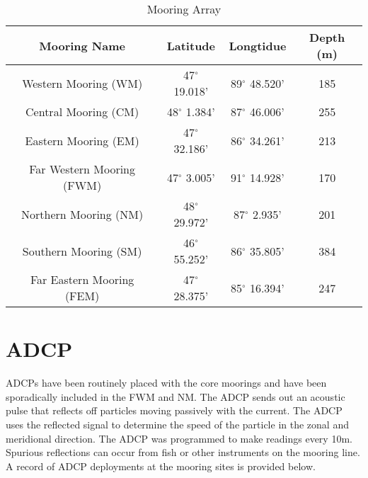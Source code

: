 

\begin{table}[H]
	\centering
		\caption{Mooring Array }
		\vspace{6pt} 
	\label{table:stratVals} %
	\begin{tabular}{c c c c}
	\hline \hline 									%
	\textbf{Mooring Name} & \textbf{Latitude} & \textbf{Longtidue} & \textbf{Depth (m)} \\ [0.5ex] %
	\hline 										
	Western Mooring (WM) & 47$^{\circ}$ 19.018' & 89$^{\circ}$ 48.520' & 185 \\ 
	Central Mooring (CM)   & 48$^{\circ}$ 1.384' & 87$^{\circ}$ 46.006' & 255 \\ 
	Eastern Mooring (EM)       & 47$^{\circ}$ 32.186' & 86$^{\circ}$ 34.261' & 213 \\ 
	\hline
	Far Western Mooring (FWM) & 47$^{\circ}$ 3.005' & 91$^{\circ}$ 14.928' & 170 \\ 
	Northern Mooring (NM) & 48$^{\circ}$ 29.972' & 87$^{\circ}$ 2.935' & 201 \\ 
	Southern Mooring (SM) & 46$^{\circ}$ 55.252' & 86$^{\circ}$ 35.805' & 384 \\ 
	Far Eastern Mooring (FEM) & 47$^{\circ}$ 28.375' & 85$^{\circ}$ 16.394' &  247  \\ [1ex] 	%
	\hline 
	\end{tabular}		
\end{table}

\section{ADCP}
ADCPs  have been routinely placed with the core moorings and have been sporadically included in the FWM and NM. The ADCP sends out an acoustic
pulse that reflects off particles moving passively with the current. The ADCP uses the reflected signal to determine the speed of the particle
in the zonal and meridional direction. The ADCP was programmed to make readings every 10m. Spurious reflections can occur from fish or other instruments
on the mooring line. A record of ADCP deployments at the mooring sites is provided below. 


